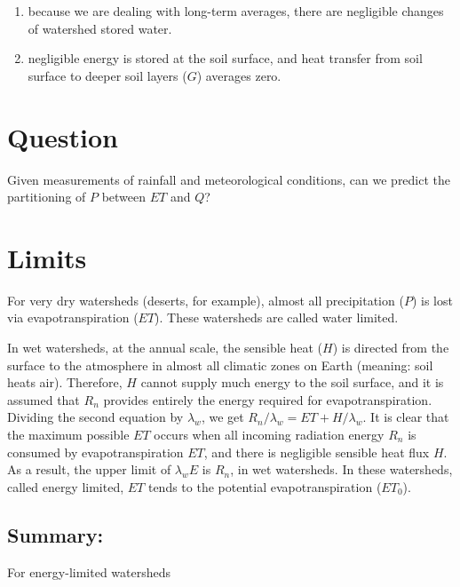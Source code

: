 \documentclass[
  letterpaper,
  DIV=11,
  numbers=noendperiod]{scrreprt}
\providecommand{\tightlist}{%
  \setlength{\itemsep}{0pt}\setlength{\parskip}{0pt}}\usepackage{longtable,booktabs,array}
\begin{document}
\begin{enumerate}
\def\labelenumi{\arabic{enumi}.}
\tightlist
\item
  because we are dealing with long-term averages, there are negligible
  changes of watershed stored water.
\item
  negligible energy is stored at the soil surface, and heat transfer
  from soil surface to deeper soil layers (\(G\)) averages zero.
\end{enumerate}

\hypertarget{question}{%
\section{Question}\label{question}}

Given measurements of rainfall and meteorological conditions, can we
predict the partitioning of \(P\) between \(ET\) and \(Q\)?

\hypertarget{limits}{%
\section{Limits}\label{limits}}

For very dry watersheds (deserts, for example), almost all precipitation
(\(P\)) is lost via evapotranspiration (\(ET\)). These watersheds are
called water limited.

In wet watersheds, at the annual scale, the sensible heat (\(H\)) is
directed from the surface to the atmosphere in almost all climatic zones
on Earth (meaning: soil heats air). Therefore, \(H\) cannot supply much
energy to the soil surface, and it is assumed that \(R_n\) provides
entirely the energy required for evapotranspiration. Dividing the second
equation by \(\lambda_w\), we get \(R_n/\lambda_w = ET + H/\lambda_w\).
It is clear that the maximum possible \(ET\) occurs when all incoming
radiation energy \(R_n\) is consumed by evapotranspiration \(ET\), and
there is negligible sensible heat flux \(H\). As a result, the upper
limit of \(\lambda_w E\) is \(R_n\), in wet watersheds. In these
watersheds, called energy limited, \(ET\) tends to the potential
evapotranspiration (\(ET_0\)).

\hypertarget{summary}{%
\subsection{Summary:}\label{summary}}

For energy-limited watersheds
\end{document}
